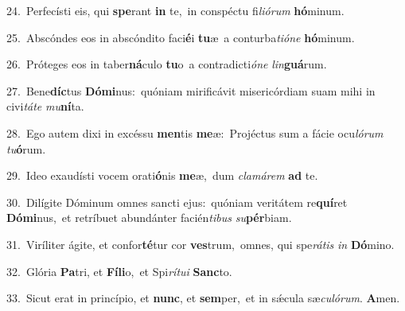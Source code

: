 {\numbfont\textcolor{\numbcolor}{24.}}~Perfecísti eis, qui \textbf{spe}\-rant \textbf{in} te,~\star in conspéctu fi\-\textit{li}\-\textit{ó}\textit{rum} \textbf{hó}\-minum.\par
{\numbfont\textcolor{\numbcolor}{25.}}~Abscóndes eos in abscóndito faci\-\textbf{é}\-i \textbf{tu}\-æ~\star a conturba\-\textit{ti}\-\textit{ó}\textit{ne} \textbf{hó}\-minum.\par
{\numbfont\textcolor{\numbcolor}{26.}}~Próteges eos in taber\-\textbf{ná}\-culo \textbf{tu}\-o~\star a contradicti\-\textit{ó}\-\textit{ne} \textit{lin}\-\textbf{guá}rum.\par
{\numbfont\textcolor{\numbcolor}{27.}}~Bene\-\textbf{díc}\-tus \textbf{Dó}\-\textbf{mi}nus:~\star quóniam mirificávit misericórdiam suam mihi in civi\-\textit{tá}\-\textit{te} \textit{mu}\-\textbf{ní}ta.\par
{\numbfont\textcolor{\numbcolor}{28.}}~Ego autem dixi in excéssu \textbf{men}\-tis \textbf{me}\-æ:~\star Projéctus sum a fácie ocu\-\textit{ló}\-\textit{rum} \textit{tu}\-\textbf{ó}rum.\par
{\numbfont\textcolor{\numbcolor}{29.}}~Ideo exaudísti vocem orati\-\textbf{ó}\-nis \textbf{me}\-æ,~\star dum \textit{cla}\-\textit{má}\textit{rem} \textbf{ad} te.\par
{\numbfont\textcolor{\numbcolor}{30.}}~Dilígite Dóminum omnes sancti ejus:~\dagger quóniam veritátem re\-\textbf{quí}\-ret \textbf{Dó}\-\textbf{mi}nus,~\star et retríbuet abundánter facién\-\textit{ti}\-\textit{bus} \textit{su}\-\textbf{pér}biam.\par
{\numbfont\textcolor{\numbcolor}{31.}}~Viríliter ágite, et confor\-\textbf{té}\-tur cor \textbf{ves}\-trum,~\star omnes, qui spe\-\textit{rá}\-\textit{tis} \textit{in} \textbf{Dó}\-mino.\par
{\numbfont\textcolor{\numbcolor}{32.}}~Glória \textbf{Pa}\-tri, et \textbf{Fí}\-\textbf{li}o,~\star et Spi\-\textit{rí}\-\textit{tu}\textit{i} \textbf{Sanc}\-to.\par
{\numbfont\textcolor{\numbcolor}{33.}}~Sicut erat in princípio, et \textbf{nunc}\-, et \textbf{sem}\-per,~\star et in sǽcula sæ\-\textit{cu}\-\textit{ló}\textit{rum}. \textbf{A}\-men.\par
